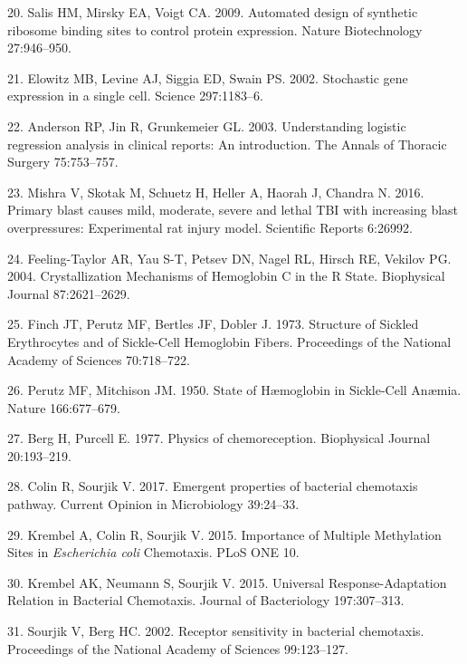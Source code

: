 \hypertarget{ref-salis2009}{}
20.
Salis
HM,
Mirsky
EA,
Voigt
CA.
2009.
Automated
design
of
synthetic
ribosome
binding
sites
to
control
protein
expression.
Nature
Biotechnology
27:946--950.

\hypertarget{ref-elowitz2002}{}
21.
Elowitz
MB,
Levine
AJ,
Siggia
ED,
Swain
PS.
2002.
Stochastic
gene
expression
in a
single
cell.
Science
297:1183--6.

\hypertarget{ref-anderson2003}{}
22.
Anderson
RP,
Jin R,
Grunkemeier
GL.
2003.
Understanding
logistic
regression
analysis
in
clinical
reports:
An
introduction.
The
Annals
of
Thoracic
Surgery
75:753--757.

\hypertarget{ref-mishra2016}{}
23.
Mishra
V,
Skotak
M,
Schuetz
H,
Heller
A,
Haorah
J,
Chandra
N.
2016.
Primary
blast
causes
mild,
moderate,
severe
and
lethal
TBI
with
increasing
blast
overpressures:
Experimental
rat
injury
model.
Scientific
Reports
6:26992.

\hypertarget{ref-feeling-taylor2004}{}
24.
Feeling-Taylor
AR,
Yau
S-T,
Petsev
DN,
Nagel
RL,
Hirsch
RE,
Vekilov
PG.
2004.
Crystallization
Mechanisms
of
Hemoglobin
C in
the R
State.
Biophysical
Journal
87:2621--2629.

\hypertarget{ref-finch1973}{}
25.
Finch
JT,
Perutz
MF,
Bertles
JF,
Dobler
J.
1973.
Structure
of
Sickled
Erythrocytes
and of
Sickle-Cell
Hemoglobin
Fibers.
Proceedings
of the
National
Academy
of
Sciences
70:718--722.

\hypertarget{ref-perutz1950}{}
26.
Perutz
MF,
Mitchison
JM.
1950.
State
of
Hæmoglobin
in
Sickle-Cell
Anæmia.
Nature
166:677--679.

\hypertarget{ref-berg1977}{}
27.
Berg
H,
Purcell
E.
1977.
Physics
of
chemoreception.
Biophysical
Journal
20:193--219.

\hypertarget{ref-colin2017}{}
28.
Colin
R,
Sourjik
V.
2017.
Emergent
properties
of
bacterial
chemotaxis
pathway.
Current
Opinion
in
Microbiology
39:24--33.

\hypertarget{ref-krembel2015a}{}
29.
Krembel
A,
Colin
R,
Sourjik
V.
2015.
Importance
of
Multiple
Methylation
Sites
in
\emph{Escherichia
coli}
Chemotaxis.
PLoS
ONE
10.

\hypertarget{ref-krembel2015}{}
30.
Krembel
AK,
Neumann
S,
Sourjik
V.
2015.
Universal
Response-Adaptation
Relation
in
Bacterial
Chemotaxis.
Journal
of
Bacteriology
197:307--313.

\hypertarget{ref-sourjik2002}{}
31.
Sourjik
V,
Berg
HC.
2002.
Receptor
sensitivity
in
bacterial
chemotaxis.
Proceedings
of the
National
Academy
of
Sciences
99:123--127.


